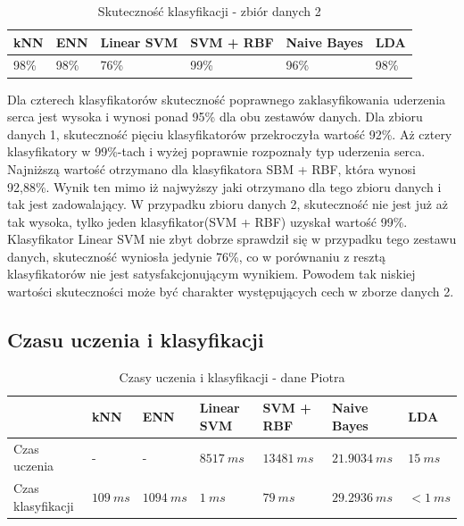 \documentclass[[10pt,a4paper]{article}
\begin{document}
\begin{table}[h]
\centering
\caption{Skuteczność klasyfikacji - zbiór danych 2}
\label{accuracyTable1}
\begin{tabular}{|l|l|l|l|l|l|}
\hline
kNN & ENN & Linear SVM & SVM + RBF & Naive Bayes & LDA \\ \hline
  98\%   &  98\%  & 76\%       & 99\%      & 96\%        &98\%     \\ \hline
\end{tabular}
\end{table}

Dla czterech klasyfikatorów skuteczność poprawnego zaklasyfikowania uderzenia serca jest wysoka i wynosi ponad 95\% dla obu zestawów danych. Dla zbioru danych 1,  skuteczność pięciu klasyfikatorów przekroczyła wartość 92\%.  Aż cztery klasyfikatory w 99\%-tach i wyżej poprawnie rozpoznały typ uderzenia serca. Najniższą wartość otrzymano dla klasyfikatora SBM + RBF, która wynosi 92,88\%. Wynik ten mimo iż najwyższy jaki otrzymano dla tego zbioru danych i tak jest zadowalający. W przypadku zbioru danych 2, skuteczność nie jest już aż tak wysoka, tylko jeden klasyfikator(SVM + RBF) uzyskał wartość 99\%. Klasyfikator Linear SVM nie zbyt dobrze sprawdził się w przypadku tego zestawu danych, skuteczność wyniosła jedynie 76\%, co w porównaniu z resztą klasyfikatorów nie jest satysfakcjonującym wynikiem. Powodem tak niskiej wartości skuteczności może być charakter występujących cech w zborze danych 2. 





\subsection{Czasu uczenia i klasyfikacji}

\begin{table}[h]
\centering
\caption{Czasy uczenia i klasyfikacji - dane Piotra}
\label{timesTable1}
\begin{tabular}{l|l|l|l|l|l|l|}
\cline{2-7}
                                        & kNN & ENN & Linear SVM & SVM + RBF & Naive Bayes & LDA \\ \hline
\multicolumn{1}{|l|}{Czas uczenia}      &  -  &  -   &  $8517\: ms$   &   $13481\: ms$   &   $21.9034\: ms$ & $15\: ms$    \\ \hline
\multicolumn{1}{|l|}{Czas klasyfikacji} &  $109 \: ms$   &   $1094\: ms$   &   $1\: ms$  &      $79\: ms$     &     $29.2936\: ms$        & $< 1\: ms$  \\ \hline
\end{tabular}
\end{table}
\end{document}
